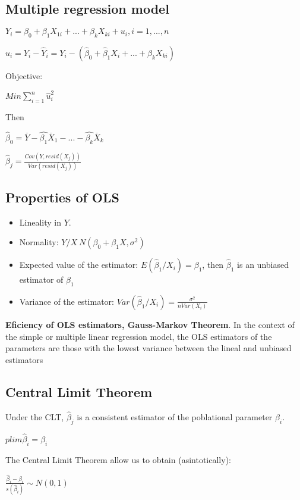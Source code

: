 \documentclass[10pt,landscape]{article}
\begin{document}
\begin{multicols}{3}
\subsection*{Multiple regression model}

$Y_i = \beta_0 + \beta_1 X_{1i} + ... + \beta_k X_{ki} + u_i, i = 1,..., n$

$\hat{u}_i = Y_i - \hat{Y}_i = Y_i - (\hat{\beta}_0 + \hat{\beta}_1 X_i + ... + \hat{\beta}_k X_{ki})$

Objective:

$Min \sum_{i=1}^n \hat{u}_i^2$

Then

$\hat{\beta}_0 = \overline{Y} - \hat{\beta_1} \overline{X}_1 - ... - \hat{\beta_k} \overline{X}_k$

$\hat{\beta}_j = \frac{Cov(Y, resid(X_j))}{Var(resid(X_j))}$

\subsection*{Properties of OLS}

\begin{itemize}
\item Lineality in $Y$.
\item Normality: $Y / X ~ N(\beta_0 + \beta_1 X, \sigma^2)$
\item Expected value of the estimator: $E(\hat{\beta}_1 / X_i) = \beta_1$, then $\hat{\beta}_1$ is an unbiased estimator of $\beta_1$
\item Variance of the estimator: $Var(\hat{\beta}_1 / X_i) = \frac{\sigma^2}{n Var(X_i)}$
\end{itemize}

\textbf{Eficiency of OLS estimators, Gauss-Markov Theorem}. In the context of the simple or multiple linear regression model, the OLS estimators of the parameters are those with the lowest variance between the lineal and unbiased estimators

\subsection*{Central Limit Theorem}
Under the CLT, $\hat{\beta}_j$ is a consistent estimator of the poblational parameter $\beta_i$.

$p lim \hat{\beta}_i = \beta_i$

The Central Limit Theorem allow us to obtain (asintotically):

$\frac{\hat{\beta}_i - \beta_i}{s(\hat{\beta}_i)} \sim N(0,1)$


\end{multicols}
\end{document}
